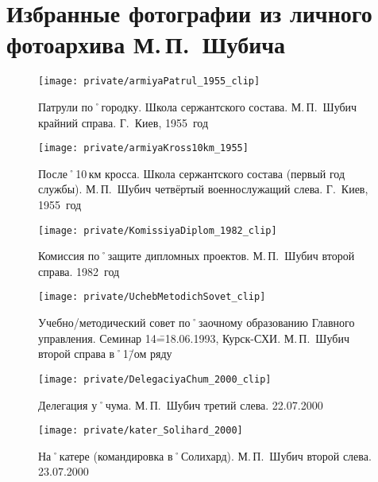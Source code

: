 ﻿\section[Фотографии из фотоархива М.\,П.~Шубича]{Избранные фотографии из личного фотоархива М.\,П.~Шубича}

\makeatletter
\setlength{\@fptop}{0pt}
\makeatother

\begin{figure}[H]
\texttt{[image: private/armiyaPatrul\_1955\_clip]}
\caption{Патрули по˚городку. Школа сержантского состава. М.\,П.~Шубич крайний справа. Г.~Киев, 1955~год}
\label{fig:armiyaPatrul_1955}
\end{figure}

\begin{figure}[h]
\texttt{[image: private/armiyaKross10km\_1955]}
\caption{После˚10\,км кросса. Школа сержантского состава (первый год службы). М.\,П.~Шубич четвёртый военнослужащий слева. Г.~Киев, 1955~год}
\label{fig:armiyaKross10km_1955}
\end{figure}

\begin{figure}[h]
\texttt{[image: private/KomissiyaDiplom\_1982\_clip]}
\caption{Комиссия по˚защите дипломных проектов. М.\,П.~Шубич второй справа. 1982~год}
\label{fig:KomissiyaDiplom_1982}
\end{figure}

\begin{figure}[h]
\texttt{[image: private/UchebMetodichSovet\_clip]}
\caption{Учебно\-/методический совет по˚заочному образованию Главного управления. Семинар 14\==18.06.1993, Курск-СХИ. М.\,П.~Шубич второй справа в˚1\=/ом ряду}
\label{fig:UchebMetodichSovet}
\end{figure}

\begin{figure}[h]
\texttt{[image: private/DelegaciyaChum\_2000\_clip]}
\caption{Делегация у˚чума. М.\,П.~Шубич третий слева. 22.07.2000}
\label{fig:DelegaciyaChum_2000}
\end{figure}

\begin{figure}[h]
\texttt{[image: private/kater\_Solihard\_2000]}
\caption{На˚катере (командировка в˚Солихард). М.\,П.~Шубич второй слева. 23.07.2000}
\label{fig:kater_Solihard_2000}
\end{figure}


